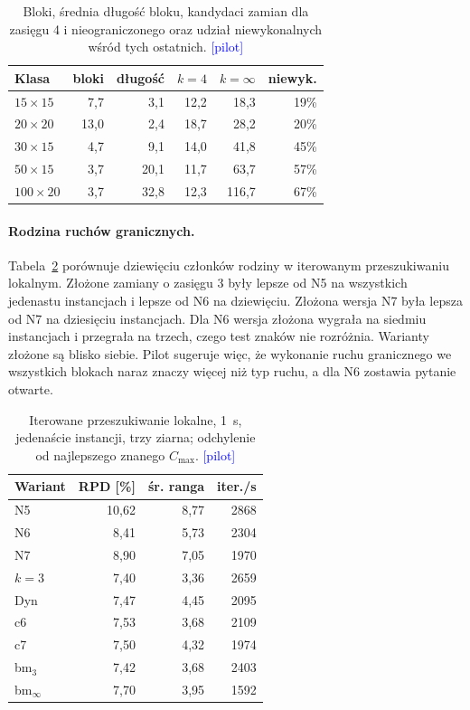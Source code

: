 \documentclass[10pt,twocolumn]{article}
\newcommand{\pilot}{\textcolor{blue}{[pilot]}}
\newcommand{\Cmax}{C_{\max}}
\begin{document}
\begin{table}[t]
\centering\small
\begin{tabular}{@{}lrrrrr@{}}
\toprule
Klasa & bloki & długość & $k{=}4$ & $k{=}\infty$ & niewyk. \\
\midrule
$15\times15$  & 7,7  & 3,1  & 12,2 & 18,3  & 19\% \\
$20\times20$  & 13,0 & 2,4  & 18,7 & 28,2  & 20\% \\
$30\times15$  & 4,7  & 9,1  & 14,0 & 41,8  & 45\% \\
$50\times15$  & 3,7  & 20,1 & 11,7 & 63,7  & 57\% \\
$100\times20$ & 3,7  & 32,8 & 12,3 & 116,7 & 67\% \\
\bottomrule
\end{tabular}
\caption{Bloki, średnia długość bloku, kandydaci zamian dla zasięgu 4
i nieograniczonego oraz udział niewykonalnych wśród tych ostatnich.
\pilot}
\label{tab:anatomy}
\end{table}

\paragraph{Rodzina ruchów granicznych.}
Tabela~\ref{tab:ils} porównuje dziewięciu członków rodziny w iterowanym
przeszukiwaniu lokalnym. Złożone zamiany o zasięgu 3 były lepsze od N5 na
wszystkich jedenastu instancjach i lepsze od N6 na dziewięciu. Złożona
wersja N7 była lepsza od N7 na dziesięciu instancjach. Dla N6 wersja
złożona wygrała na siedmiu instancjach i przegrała na trzech, czego test
znaków nie rozróżnia. Warianty złożone są blisko siebie. Pilot sugeruje
więc, że wykonanie ruchu granicznego we wszystkich blokach naraz znaczy
więcej niż typ ruchu, a dla N6 zostawia pytanie otwarte.

\begin{table}[t]
\centering\small
\begin{tabular}{@{}lrrr@{}}
\toprule
Wariant & RPD [\%] & śr. ranga & iter./s \\
\midrule
N5        & 10,62 & 8,77 & 2868 \\
N6        & 8,41  & 5,73 & 2304 \\
N7        & 8,90  & 7,05 & 1970 \\
$k=3$     & 7,40  & 3,36 & 2659 \\
Dyn       & 7,47  & 4,45 & 2095 \\
c6        & 7,53  & 3,68 & 2109 \\
c7        & 7,50  & 4,32 & 1974 \\
bm$_3$    & 7,42  & 3,68 & 2403 \\
bm$_\infty$ & 7,70 & 3,95 & 1592 \\
\bottomrule
\end{tabular}
\caption{Iterowane przeszukiwanie lokalne, 1~s, jedenaście instancji,
trzy ziarna; odchylenie od najlepszego znanego $\Cmax$. \pilot}
\label{tab:ils}
\end{table}
\end{document}
